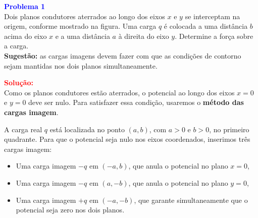 \documentclass[a4paper,12pt]{article}
\begin{document}
\begin{flushleft}
\textbf{\textcolor{blue}{\Large Problema 1}}\\

Dois planos condutores aterrados ao longo dos eixos \(x\) e \(y\) se 
interceptam na origem, conforme mostrado na figura. Uma carga \(q\) 
é colocada a uma distância \(b\) acima do eixo \(x\) e a uma distância 
\(a\) à direita do eixo \(y\). Determine a força sobre a carga.\\

\noindent
\textbf{Sugestão:} as cargas imagens devem fazer com que as condições de 
contorno sejam mantidas nos dois planos simultaneamente.

\vspace{0.5cm}

\begin{center}
\end{center}

\textcolor{red}{\textbf{Solução:}}\\

Como os planos condutores estão aterrados, o potencial ao longo dos eixos \(x = 0\) e \(y = 0\) deve ser nulo. Para satisfazer essa condição, usaremos o \textbf{método das cargas imagem}.

A carga real \(q\) está localizada no ponto \((a, b)\), com \(a > 0\) e \(b > 0\), no primeiro quadrante. Para que o potencial seja nulo nos eixos coordenados, inserimos três cargas imagem:

\begin{itemize}
  \item Uma carga imagem \(-q\) em \((-a, b)\), que anula o potencial no plano \(x = 0\),
  \item Uma carga imagem \(-q\) em \((a, -b)\), que anula o potencial no plano \(y = 0\),
  \item Uma carga imagem \(+q\) em \((-a, -b)\), que garante simultaneamente que o potencial seja zero nos dois planos.
\end{itemize}


\end{flushleft}
\end{document}
